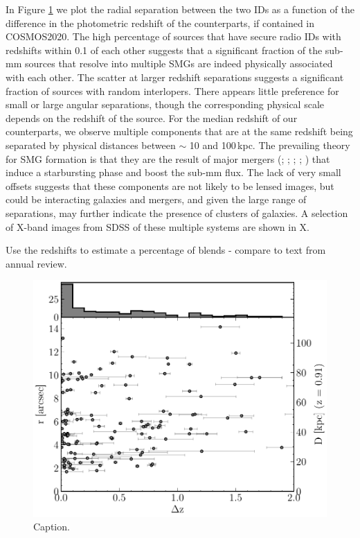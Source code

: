 In Figure \ref{fig:multiples_separation} we plot the radial separation between the two IDs as a function of the difference in the photometric redshift of the counterparts, if contained in COSMOS2020. The high percentage of sources that have secure radio IDs with redshifts within 0.1 of each other suggests that a significant fraction of the sub-mm sources that resolve into multiple SMGs are indeed physically associated with each other. The scatter at larger redshift separations suggests a significant fraction of sources with random interlopers. There appears little preference for small or large angular separations, though the corresponding physical scale depends on the redshift of the source. For the median redshift of our counterparts, we observe multiple components that are at the same redshift being separated by physical distances between $\sim$ 10 and 100\,kpc. The prevailing theory for SMG formation is that they are the result of major mergers (\citealt{Ivison_2002}; \citealt{Smail_2004}; \citealt{Ivison_2007}; \citealt{Engel_2010}; \citealt{Hayward_2011}) that induce a starbursting phase and boost the sub-mm flux. The lack of very small offsets suggests that these components are not likely to be lensed images, but could be interacting galaxies and mergers, and given the large range of separations, may further indicate the presence of clusters of galaxies. A selection of {\color{red}X}-band images from SDSS of these multiple systems are shown in {\color{red}X}.

{\color{red}Use the redshifts to estimate a percentage of blends - compare to text from annual review.}

\begin{figure}
	\centering
	\includegraphics[width=0.75\columnwidth]{Figures/multiples_separation.pdf}
	\caption{{\color{red} Caption.}}
	\label{fig:multiples_separation}
\end{figure}

